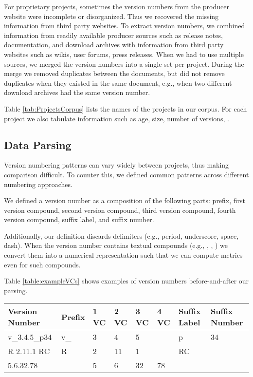 \documentclass[conference]{IEEEtran}
\begin{document}
For proprietary projects, sometimes the version numbers from the producer website
were incomplete or disorganized. Thus we recovered the missing information from third party websites.
To extract version numbers, we combined information from readily available producer sources such as release notes, documentation, and download archives
with information from third party websites such as wikis, user forums, press releases.
When we had to use multiple sources, we merged the version numbers into a single set per project. During the merge we removed duplicates between the documents, but did not remove duplicates when they existed in the same document, e.g., when two different download archives had the same version number.

Table \ref{tab:ProjectsCorpus} lists the names of the projects in our corpus. For each project we also tabulate information such as age, size, number of versions, .

\subsection{Data Parsing}

 Version numbering patterns can vary widely between projects, thus making comparison difficult. 
To counter this, we defined common patterns across different numbering approaches. 

We defined a version number as a composition of the following parts: 
prefix, first version compound, second
 version compound, third version compound, fourth version compound, suffix label, and suffix number. 

Additionally, our definition discards delimiters (e.g., period, underscore, space, dash). When the version number contains textual compounds (e.g., , , ) we convert them into a numerical representation such that we can compute metrics even for such compounds. 

Table \ref{table:exampleVCs} shows examples of version numbers before-and-after 
our parsing.
 
 \begin{table*}[t]
 \begin{center}
\begin{tabular}{| *{8}{l|}}
\hline
Version Number & Prefix & 1 VC & 2 VC & 3 VC & 4 VC  & Suffix Label & Suffix Number \\ \hline
v\_3.4.5\_p34 & v\_ & 3 & 4 & 5 & & p & 34 \\
R 2.11.1 RC & R & 2 & 11 & 1 & & RC & \\
5.6.32.78 &  & 5 & 6 & 32 & 78 & & \\ \hline

\end{tabular}
\end{center}
\caption{Numeric version compounds are bolded. }
\label{table:exampleVCs}
\end{table*}
 
\end{document}
